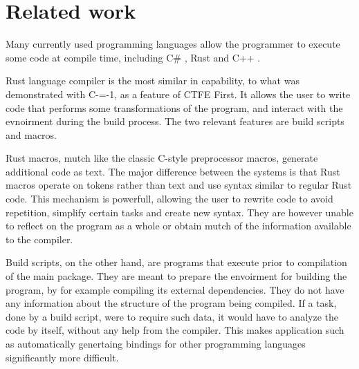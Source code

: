 \section{Related work}
\label{related-work} 

Many currently used programming languages allow the programmer to execute some code at compile time, including C\# \cite{csharp:source_generators,roslyn}, Rust \cite{rust, klabnik2019rust} and C++ \cite{ISO:cpp20}.

Rust language compiler is the most similar in capability, to what was demonstrated with C-=-1, as a feature of CTFE First.
It allows the user to write code that performs some transformations of the program, and interact with the evnoirment during the build process.
The two relevant features are build scripts and macros.

Rust macros, mutch like the classic C-style preprocessor macros, generate additional code as text.
The major difference between the systems is that Rust macros operate on tokens rather than text and use syntax similar to regular Rust code.
This mechanism is powerfull, allowing the user to rewrite code to avoid repetition, simplify certain tasks and create new syntax.
They are however unable to reflect on the program as a whole or obtain mutch of the information available to the compiler.

Build scripts, on the other hand, are programs that execute prior to compilation of the main package.
They are meant to prepare the envoirment for building the program, by for example compiling its external dependencies.
They do not have any information about the structure of the program being compiled.
If a task, done by a build script, were to require such data, it would have to analyze the code by itself, without any help from the compiler.
This makes application such as automatically genertaing bindings for other programming languages significantly more difficult.
